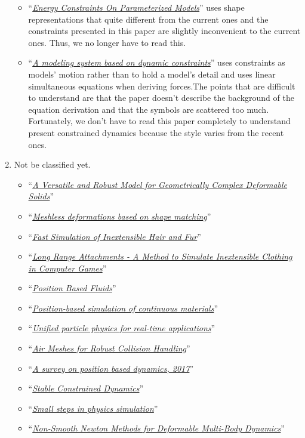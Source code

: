 \documentclass[pdflatex,sn-mathphys-num]{sn-jnl}%
\theoremstyle{thmstyleone}%
\theoremstyle{thmstyletwo}%
\theoremstyle{thmstylethree}%
\newcommand{\pname}[1]{``{\uline{\sl {#1}}}''}
\begin{document}
\begin{enumerate}
\begin{itemize}
		\item \pname{Energy Constraints On Parameterized Models}\cite{EnergyWitkin1987} uses shape representations that quite different from the current ones and the constraints presented in this paper are slightly inconvenient to the current ones. Thus, we no longer have to read this.
		\newline
		\item \pname{A modeling system based on dynamic constraints}\cite{Barzel1988} uses constraints as models' motion rather than to hold a model's detail and uses linear simultaneous equations when deriving forces.The points that are difficult to understand are that the paper doesn't describe the background of the equation derivation and that the symbols are scattered too much.
		Fortunately, we don't have to read this paper completely to understand present constrained dynamics because the style varies from the recent ones.
		\end{itemize}
	\item Not be classified yet.
		\begin{itemize}
			\item \pname{A Versatile and Robust Model for Geometrically Complex Deformable Solids}\cite{VersatileTeschner}
			\item \pname{Meshless deformations based on shape matching}\cite{MeshlessMuller2005}
			\item \pname{Fast Simulation of Inextensible Hair and Fur}\cite{InextensibleHair}
			\item \pname{Long Range Attachments - A Method to Simulate Inextensible Clothing in Computer Games}\cite{LongRangeAttachments}
			\item \pname{Position Based Fluids}\cite{PosBaseFluids}
			\item \pname{Position-based simulation of continuous materials}\cite{PBContimuousBENDER2014}
			\item \pname{Unified particle physics for real-time applications}\cite{UnifiedParticle}
			\item \pname{Air Meshes for Robust Collision Handling}\cite{AirMesh}
			\item \pname{A survey on position based dynamics, 2017}\cite{PBDCoursenote}
			\item \pname{Stable Constrained Dynamics}\cite{StableConstrainedDyn}
			\item \pname{Small steps in physics simulation}\cite{SmallSteps}
			\item \pname{Non-Smooth Newton Methods for Deformable Multi-Body Dynamics}\cite{NonSmooth}

\end{itemize}
\end{enumerate}
\end{document}
